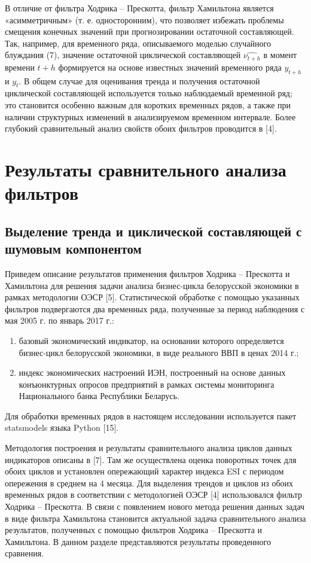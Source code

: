 \documentclass[a4paper,14pt]{extreport}
\begin{document}
	В отличие от фильтра Ходрика – Прескотта, фильтр Хамильтона является «асимметричным» (т. е. односторонним), что позволяет избежать проблемы смещения конечных значений при прогнозировании остаточной составляющей. Так, например, для временного ряда, описываемого моделью случайного блуждания (7),  значение остаточной циклической составляющей $\hat{\nu_{t+h}}$ в момент времени $t+h$ формируется на основе известных значений временного ряда $y_{t+h}$ и $y_t$. В общем случае для оценивания тренда и получения остаточной циклической составляющей используется только наблюдаемый временной ряд; это становится особенно важным для коротких временных рядов, а также при наличии структурных изменений в анализируемом временном интервале. Более глубокий сравнительный анализ свойств обоих фильтров проводится в [4].
	
	\section{Результаты сравнительного анализа фильтров}
	
	\subsection{Выделение тренда и циклической составляющей с шумовым компонентом}
	
	Приведем описание результатов применения фильтров Ходрика – Прескотта и Хамильтона для решения задачи анализа бизнес-цикла белорусской экономики в рамках методологии ОЭСР [5]. Статистической обработке с помощью указанных фильтров подвергаются два временных ряда, полученные за период наблюдения с мая 2005 г. по январь 2017 г.: 
	
	\begin{enumerate}
		\item базовый экономический индикатор, на основании которого определяется бизнес-цикл белорусской экономики, в виде реального ВВП в ценах 2014 г.;
		\item индекс экономических настроений ИЭН, построенный на основе данных конъюнктурных опросов предприятий в рамках системы мониторинга Национального банка Республики Беларусь.
	\end{enumerate}

	Для обработки временных рядов в настоящем исследовании используется пакет statsmodels языка Python [15].
	
	Методология построения и результаты сравнительного анализа циклов данных индикаторов описаны в [7]. Там же осуществлена оценка поворотных точек для обоих циклов и установлен опережающий характер индекса ESI с периодом опережения в среднем на 4 месяца. Для выделения трендов и циклов из обоих временных рядов в соответствии с методологией ОЭСР [4] использовался фильтр Ходрика – Прескотта. В связи с появлением нового метода решения данных задач в виде фильтра Хамильтона становится актуальной задача сравнительного анализа результатов, полученных с помощью фильтров Ходрика – Прескотта и Хамильтона. В данном разделе представляются результаты проведенного сравнения. 
	
\end{document}
